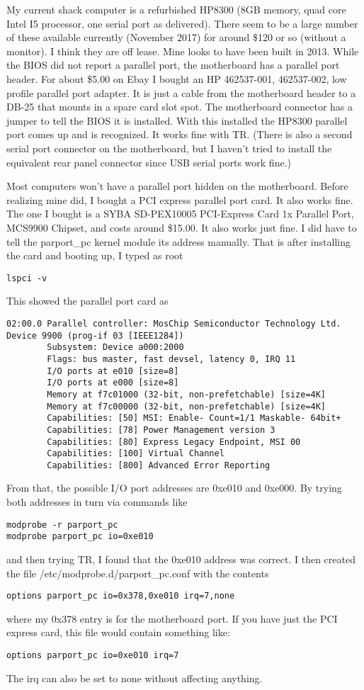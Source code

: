 \documentclass[12pt]{article}
\begin{document}
My current shack computer is a refurbished HP8300
(8GB memory, quad core Intel I5 processor, one serial port as delivered).
There seem to be
a large number of these available currently (November 2017) for around
\$120 or so (without a monitor). I think
they are off lease.  Mine
looks to have been built in 2013. While the BIOS did not report a
parallel port, the motherboard has a parallel port header. For about
\$5.00 on Ebay I bought an HP 462537-001, 462537-002, low profile
parallel port adapter. It is just a cable from the motherboard header
to a DB-25 that mounts in a spare card slot spot.
The motherboard connector has a jumper to tell the BIOS
it is installed. With this installed the HP8300 parallel port 
comes up and is recognized. It works fine with TR. (There is also
a second serial port connector on the motherboard, but I haven't
tried to
install the equivalent rear panel connector since USB serial ports
work fine.)

Most computers won't have a parallel port hidden on the motherboard.
Before realizing mine did, I bought a PCI express parallel port
card. It also works fine. The one I bought is a
SYBA SD-PEX10005 PCI-Express Card 1x Parallel Port, MCS9900 Chipset,
and costs around \$15.00. It also works just fine. I did have to
tell the parport\_pc kernel module its address manually. That is
after installing the card and booting up, I typed as root
\begin{verbatim}
lspci -v
\end{verbatim}
This showed the parallel port card as
\begin{verbatim}
02:00.0 Parallel controller: MosChip Semiconductor Technology Ltd. Device 9900 (prog-if 03 [IEEE1284])
        Subsystem: Device a000:2000
        Flags: bus master, fast devsel, latency 0, IRQ 11
        I/O ports at e010 [size=8]
        I/O ports at e000 [size=8]
        Memory at f7c01000 (32-bit, non-prefetchable) [size=4K]
        Memory at f7c00000 (32-bit, non-prefetchable) [size=4K]
        Capabilities: [50] MSI: Enable- Count=1/1 Maskable- 64bit+
        Capabilities: [78] Power Management version 3
        Capabilities: [80] Express Legacy Endpoint, MSI 00
        Capabilities: [100] Virtual Channel
        Capabilities: [800] Advanced Error Reporting
\end{verbatim}
From that, the possible I/O port addresses are 0xe010 and  0xe000.
By trying both addresses in turn via commands like
\begin{verbatim}
modprobe -r parport_pc
modprobe parport_pc io=0xe010
\end{verbatim}
and then trying TR,
I found that the 0xe010 address was correct. I then created the file
/etc/modprobe.d/parport\_pc.conf with the contents
\begin{verbatim}
options parport_pc io=0x378,0xe010 irq=7,none
\end{verbatim}
where my 0x378 entry is for the motherboard port. If you have just the
PCI express card, this file would contain something like:
\begin{verbatim}
options parport_pc io=0xe010 irq=7
\end{verbatim}
The irq can also be set to none without affecting anything.
\end{document}
